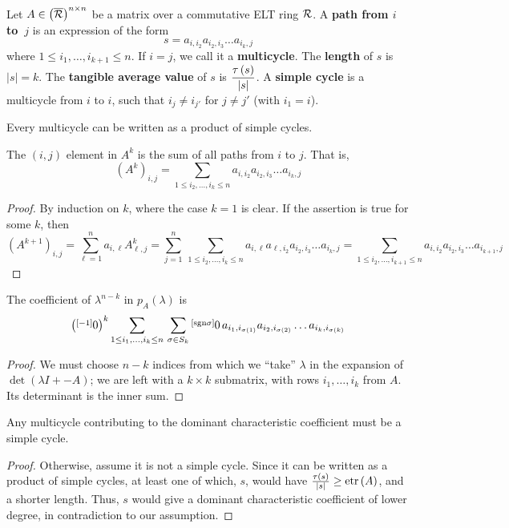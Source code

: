 \begin{defn}
Let $A\in \left(\overline{\mathcal{R}}\right)^{n\times n}$ be a matrix over a commutative ELT ring $\mathcal{R}$. A \textbf{path from $i$ to~$j$} is an expression of the form
$$s=a_{i,i_{2}}a_{i_{2},i_{3}}\dots a_{i_{k},j}$$
where $1\leq i_{1},\dots,i_{k+1}\leq n$. If $i=j$, we call it a \textbf{multicycle}. The \textbf{length} of $s$ is $\left|s\right|=k$. The \textbf{tangible average value} of $s$ is $\displaystyle{\frac{\tau\left(s\right)}{\left|s\right|}}$. A \textbf{simple cycle} is a multicycle from $i$ to $i$, such that $i_{j}\neq i_{j'}$ for $j\neq j'$ (with $i_{1}=i$).
\end{defn}

\begin{fact}
Every multicycle can be written as a product of simple cycles.
\end{fact}

\begin{lem}\label{lem:i,j-ele-of-A^k}
The $\left(i,j\right)$ element in $A^{k}$ is the sum of all paths from $i$ to $j$. That is,
$$\left(A^{k}\right)_{i,j}=\sum_{1\leq i_{2},\dots,i_{k}\leq n}a_{i,i_{2}}a_{i_{2},i_{3}}\dots a_{i_{k},j}$$
\end{lem}
\begin{proof}
By induction on $k$, where the case $k=1$ is clear. If the assertion is true for some $k$, then
$$\left(A^{k+1}\right)_{i,j}=\sum_{\ell=1}^{n}a_{i,\ell}A_{\ell,j}^{k}=\sum_{j=1}^{n}\,\sum_{1\leq i_{2},\dots,i_{k}\leq n}a_{i,\ell}a_{\ell,i_{2}}a_{i_{2},i_{3}}\dots a_{i_{k},j}=\sum_{1\leq i_{2},\dots,i_{k+1}\leq n}a_{i,i_{2}}a_{i_{2},i_{3}}\dots a_{i_{k+1},j}$$
\end{proof}

\begin{lem}\label{lem:coeff-of-char-poly}
The coefficient of $\lambda^{n-k}$ in $p_{A}\left(\lambda\right)$ is
$$\left(\overset{\left[-1\right]}{}0\right)^{k}\sum_{1\leq i_{1},\dots,i_{k}\leq n}\,\sum_{\sigma\in S_{k}}\overset{\left[\textnormal{sgn}\sigma\right]}{}0\, a_{i_{1},i_{\sigma\left(1\right)}}a_{i_{2},i_{\sigma\left(2\right)}}\dots a_{i_{k},i_{\sigma\left(k\right)}}$$
\end{lem}
\begin{proof}
We must choose $n-k$ indices from which we ``take'' $\lambda$ in the expansion of $\det\left(\lambda I+\minus A\right)$; we are left with a $k\times k$ submatrix, with rows $i_{1},\dots,i_{k}$ from $A$. Its determinant is the inner sum.
\end{proof}

\begin{lem}\label{lem:Mulcyc-contr-to-etr}
Any multicycle contributing to the dominant characteristic coefficient must be a simple cycle.
\end{lem}
\begin{proof}
Otherwise, assume it is not a simple cycle. Since it can be written as a product of simple cycles, at least one of which, $s$, would have $\frac{\tau\left(s\right)}{\left|s\right|}\ge\textnormal{etr}\left(A\right)$, and a shorter length. Thus, $s$ would give a dominant characteristic coefficient of lower degree, in contradiction to our assumption.
\end{proof}

